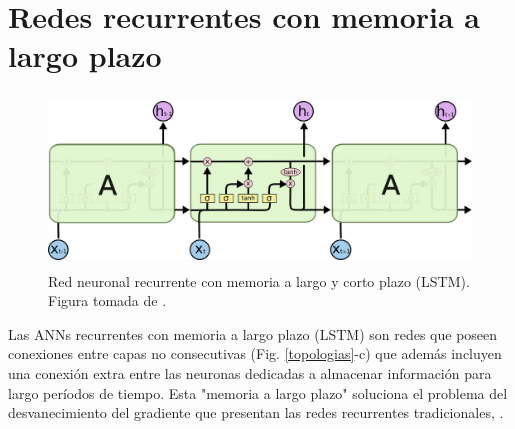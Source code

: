 
\section{Redes recurrentes con memoria a largo plazo}


\begin{figure}[h!]
  \begin{center}
    \includegraphics[height=1.8in]{Figures/LSTM3-chain.png}
    \caption{ Red neuronal recurrente con memoria a largo y corto plazo (LSTM). Figura tomada de \cite{olah}. }
    \label{LSTM}
  \end{center}
\end{figure}

Las ANNs recurrentes con memoria a largo plazo (LSTM) son redes que poseen conexiones entre capas 
no consecutivas (Fig. \ref{topologias}-c) que además incluyen una conexión extra entre las neuronas dedicadas
 a almacenar información para largo períodos de tiempo. 
 Esta "memoria a largo plazo" soluciona el problema del desvanecimiento del gradiente que presentan las redes recurrentes 
 tradicionales\cite{Kratzert}, \cite{olah}.

